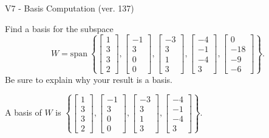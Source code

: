 \begin{exercise}
  \begin{exerciseTitle}V7 - Basis Computation (ver. 137)\end{exerciseTitle}
  \begin{exerciseStatement}
    Find a basis for the subspace 
\[W=\mathrm{span}\ \left\{\left[\begin{array}{r}
1 \\
3 \\
3 \\
2
\end{array}\right] , \left[\begin{array}{r}
-1 \\
3 \\
0 \\
0
\end{array}\right] , \left[\begin{array}{r}
-3 \\
3 \\
1 \\
3
\end{array}\right] , \left[\begin{array}{r}
-4 \\
-1 \\
-4 \\
3
\end{array}\right] , \left[\begin{array}{r}
0 \\
-18 \\
-9 \\
-6
\end{array}\right]\right\}.\]
 Be sure to explain why your result is a basis.


  \end{exerciseStatement}
  \begin{exerciseAnswer}
   A basis of \(W\) is  \(\left\{\left[\begin{array}{r}
1 \\
3 \\
3 \\
2
\end{array}\right] , \left[\begin{array}{r}
-1 \\
3 \\
0 \\
0
\end{array}\right] , \left[\begin{array}{r}
-3 \\
3 \\
1 \\
3
\end{array}\right] , \left[\begin{array}{r}
-4 \\
-1 \\
-4 \\
3
\end{array}\right]\right\}\).
  


  \end{exerciseAnswer}
\end{exercise}